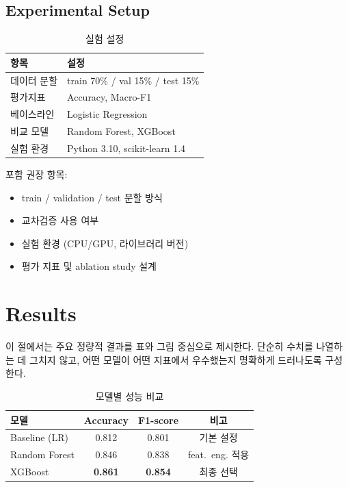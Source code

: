 \documentclass[10pt,a4paper,twocolumn]{article}
\begin{document}
\subsection{Experimental Setup}

\begin{table}[h]
\vspace{-4pt}
\centering
\footnotesize
\setlength{\tabcolsep}{3pt}
\caption{실험 설정}
\begin{tabularx}{\columnwidth}{@{}p{18mm}X@{}}
\toprule
항목 & 설정 \\
\midrule
데이터 분할 & train 70\% / val 15\% / test 15\% \\
평가지표 & Accuracy, Macro-F1 \\
베이스라인 & Logistic Regression \\
비교 모델 & Random Forest, XGBoost \\
실험 환경 & Python 3.10, scikit-learn 1.4 \\
\bottomrule
\end{tabularx}
\vspace{-4pt}
\end{table}

포함 권장 항목:
\begin{itemize}
  \item train / validation / test 분할 방식
  \item 교차검증 사용 여부
  \item 실험 환경 (CPU/GPU, 라이브러리 버전)
  \item 평가 지표 및 ablation study 설계
\end{itemize}

\section{Results}

이 절에서는 주요 정량적 결과를 표와 그림 중심으로 제시한다. 단순히 수치를 나열하는
데 그치지 않고, 어떤 모델이 어떤 지표에서 우수했는지 명확하게 드러나도록 구성한다.

\begin{table}[h]
\vspace{-4pt}
\centering
\footnotesize
\setlength{\tabcolsep}{4pt}
\caption{모델별 성능 비교}
\begin{tabular}{@{}lccc@{}}
\toprule
모델 & Accuracy & F1-score & 비고 \\
\midrule
Baseline (LR)  & 0.812 & 0.801 & 기본 설정 \\
Random Forest  & 0.846 & 0.838 & feat.\ eng. 적용 \\
XGBoost        & \textbf{0.861} & \textbf{0.854} & 최종 선택 \\
\bottomrule
\end{tabular}
\vspace{-4pt}
\end{table}
\end{document}
